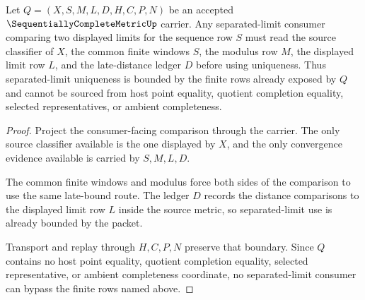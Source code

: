\begin{theorem}
\label{thm:sequentially-complete-metric-limit-uniqueness-boundary}
Let $Q=(X,S,M,L,D,H,C,P,N)$ be an accepted $\SequentiallyCompleteMetricUp$ carrier. Any separated-limit consumer comparing two displayed limits for the sequence row $S$ must read the source classifier of $X$, the common finite windows $S$, the modulus row $M$, the displayed limit row $L$, and the late-distance ledger $D$ before using uniqueness. Thus separated-limit uniqueness is bounded by the finite rows already exposed by $Q$ and cannot be sourced from host point equality, quotient completion equality, selected representatives, or ambient completeness.
\end{theorem}
\begin{proof}
Project the consumer-facing comparison through the carrier. The only source classifier available is the one displayed by $X$, and the only convergence evidence available is carried by $S,M,L,D$.

The common finite windows and modulus force both sides of the comparison to use the same late-bound route. The ledger $D$ records the distance comparisons to the displayed limit row $L$ inside the source metric, so separated-limit use is already bounded by the packet.

Transport and replay through $H,C,P,N$ preserve that boundary. Since $Q$ contains no host point equality, quotient completion equality, selected representative, or ambient completeness coordinate, no separated-limit consumer can bypass the finite rows named above.
\end{proof}


